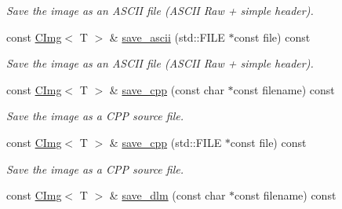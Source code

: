 \begin{DoxyCompactItemize}
\begin{DoxyCompactList}\small\item\em Save the image as an ASCII file (ASCII Raw + simple header). \item\end{DoxyCompactList}\item 
\hypertarget{structcimg__library_1_1CImg_a6799d54ce17c0ae5c07e9fd53e658dfa}{
const \hyperlink{structcimg__library_1_1CImg}{CImg}$<$ T $>$ \& \hyperlink{structcimg__library_1_1CImg_a6799d54ce17c0ae5c07e9fd53e658dfa}{save\_\-ascii} (std::FILE $\ast$const file) const }
\label{structcimg__library_1_1CImg_a6799d54ce17c0ae5c07e9fd53e658dfa}

\begin{DoxyCompactList}\small\item\em Save the image as an ASCII file (ASCII Raw + simple header). \item\end{DoxyCompactList}\item 
\hypertarget{structcimg__library_1_1CImg_a869bb2e7c1fe0896e143016ba4030065}{
const \hyperlink{structcimg__library_1_1CImg}{CImg}$<$ T $>$ \& \hyperlink{structcimg__library_1_1CImg_a869bb2e7c1fe0896e143016ba4030065}{save\_\-cpp} (const char $\ast$const filename) const }
\label{structcimg__library_1_1CImg_a869bb2e7c1fe0896e143016ba4030065}

\begin{DoxyCompactList}\small\item\em Save the image as a CPP source file. \item\end{DoxyCompactList}\item 
\hypertarget{structcimg__library_1_1CImg_a947dc7fb7b126d9df6abf379147947b6}{
const \hyperlink{structcimg__library_1_1CImg}{CImg}$<$ T $>$ \& \hyperlink{structcimg__library_1_1CImg_a947dc7fb7b126d9df6abf379147947b6}{save\_\-cpp} (std::FILE $\ast$const file) const }
\label{structcimg__library_1_1CImg_a947dc7fb7b126d9df6abf379147947b6}

\begin{DoxyCompactList}\small\item\em Save the image as a CPP source file. \item\end{DoxyCompactList}\item 
\hypertarget{structcimg__library_1_1CImg_ae2c4bfc725e65a27f7f21e74b6da319d}{
const \hyperlink{structcimg__library_1_1CImg}{CImg}$<$ T $>$ \& \hyperlink{structcimg__library_1_1CImg_ae2c4bfc725e65a27f7f21e74b6da319d}{save\_\-dlm} (const char $\ast$const filename) const }
\label{structcimg__library_1_1CImg_ae2c4bfc725e65a27f7f21e74b6da319d}


\end{DoxyCompactItemize}
